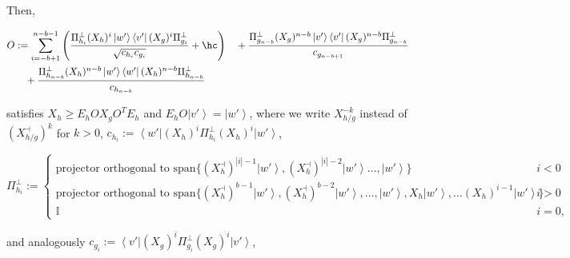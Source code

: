 \documentclass{theoretics}
\begin{document}
\begin{proposition}
\begin{itemize}
  \end{itemize}
  Then,\begin{footnotesize}
    \begin{align*}
      O & :=\sum_{i=-b+1}^{n-b-1}\left(\frac{\Pi_{h_{i}}^{\perp}(X_{h})^{i}\left|w'\right\rangle \left\langle v'\right|(X_{g})^{i}\Pi_{g_{i}}^{\perp}}{\sqrt{c_{h_{i}}c_{g_{i}}}}+\hc\right)
      \quad+\frac{\Pi_{g_{n-b}}^{\perp}(X_{g})^{n-b}\left|v'\right\rangle \left\langle v'\right|(X_{g})^{n-b}\Pi_{g_{n-b}}^{\perp}}{c_{g_{n-b+1}}}                                           \\
        & \quad+\frac{\Pi_{h_{n-b}}^{\perp}(X_{h})^{n-b}\left|w'\right\rangle \left\langle w'\right|(X_{h})^{n-b}\Pi_{h_{n-b}}^{\perp}}{c_{h_{n-b}}}
    \end{align*}
  \end{footnotesize}
  satisfies $X_{h}\ge E_{h}OX_{g}O^{T}E_{h}$ and $E_{h}O\left|v'\right\rangle =\left|w'\right\rangle$,
  where we write $X_{h/g}^{-k}$ instead of $(X_{h/g}^{\dashv})^{k}$
  for $k>0$, $c_{h_{i}}:=\left\langle w'\right|(X_{h})^{i}\Pi_{h_{i}}^{\perp}(X_{h})^{i}\left|w'\right\rangle $,
  \begin{footnotesize}
    \begin{displaymath}
      \Pi_{h_{i}}^{\perp}:=\begin{cases}
        \text{projector orthogonal to }\text{span}\{(X_{h}^{\dashv})^{|i|-1}\left|w'\right\rangle ,(X_{h}^{\dashv})^{|i|-2}\left|w'\right\rangle \dots,\left|w'\right\rangle \}                                                                   & i<0  \\
        \text{projector orthogonal to }\text{span}\{(X_{h}^{\dashv})^{b-1}\left|w'\right\rangle ,(X_{h}^{\dashv})^{b-2}\left|w'\right\rangle ,\dots,\left|w'\right\rangle ,X_{h}\left|w'\right\rangle ,\dots(X_{h})^{i-1}\left|w'\right\rangle \} & i>0  \\
        \mathbb{I}                                                                                                                                                                                                                                & i=0,
      \end{cases}
    \end{displaymath}
  \end{footnotesize}
  and analogously  $c_{g_{i}}:=\left\langle v'\right|(X_{g})^{i}\Pi_{g_{i}}^{\perp}(X_{g})^{i}\left|v'\right\rangle $,
  \begin{footnotesize}
    \begin{displaymath}

\end{displaymath}
\end{footnotesize}
\end{proposition}
\end{document}

